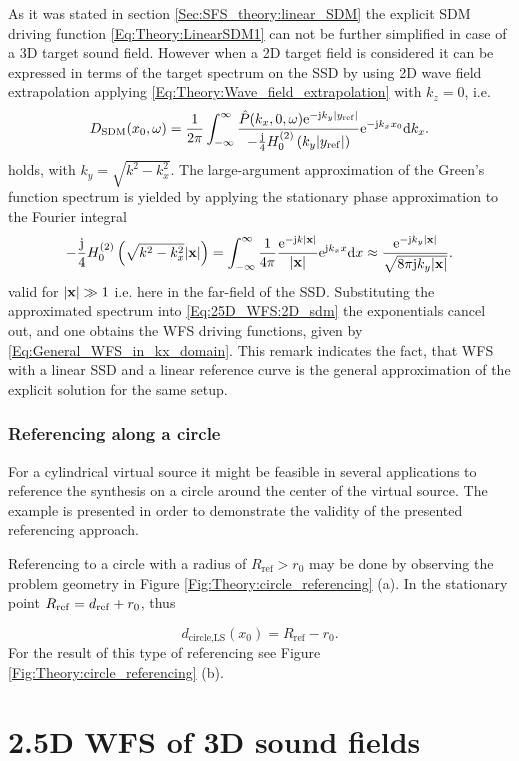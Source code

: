 \vspace{3mm}
As it was stated in section \ref{Sec:SFS_theory:linear_SDM} the explicit SDM driving function \eqref{Eq:Theory:LinearSDM1} can not be further simplified in case of a 3D target sound field. However when a 2D target field is considered it can be expressed in terms of the target spectrum on the SSD by using 2D wave field extrapolation applying \eqref{Eq:Theory:Wave_field_extrapolation} with $k_z = 0$, i.e.
%
 \begin{equation}
D_{\mathrm{SDM}}(x_0,\omega) = \frac{1}{2\pi} \int_{-\infty}^{\infty} \frac{ \hat{P}(k_x,0,\omega) \mathrm{e}^{-\mathrm{j} k_y |y_{\mathrm{ref}}|}}{
-\frac{\mathrm{j}}{4}H_0^{(2)}\left( k_y |y_{\mathrm{ref}}| \right) }
\mathrm{e}^{-\mathrm{j} k_x x_0 }
\mathrm{d} k_x.
\label{Eq:25D_WFS:2D_sdm}
\end{equation}
holds, with $k_y = \sqrt{k^2-k_x^2}$.
The large-argument approximation of the Green's function spectrum is yielded by applying the stationary phase approximation to the Fourier integral 
\begin{equation}
-\frac{\mathrm{j}}{4} H_0^{(2)} \left( \sqrt{k^2-k_x^2} |\mathbf{x}| \right)  = \int_{-\infty}^{\infty} \frac{1}{4\pi} \frac{\mathrm{e}^{-\mathrm{j} k|\mathbf{x}|}}{|\mathbf{x}|}
\mathrm{e}^{\mathrm{j} k_x x} \mathrm{d} x
\approx  
\frac{\mathrm{e}^{-\mathrm{j} k_y |\mathbf{x}|}}{\sqrt{8\pi\mathrm{j} k_y |\mathbf{x}|}}.
\end{equation}
valid for $|\mathbf{x}| \gg 1$ i.e. here in the far-field of the SSD. Substituting the approximated spectrum into \eqref{Eq:25D_WFS:2D_sdm} the exponentials cancel out, and one obtains the WFS driving functions, given by \eqref{Eq:General_WFS_in_kx_domain}. This remark indicates the fact, that WFS with a linear SSD and a linear reference curve is the general approximation of the explicit solution for the same setup.

\subsubsection{Referencing along a circle}
For a cylindrical virtual source it might be feasible in several applications to reference the synthesis on a circle around the center of the virtual source. The example is presented in order to demonstrate the validity of the presented referencing approach.

Referencing to a circle with a radius of $R_{\mathrm{ref}} > r_0$ may be done by observing the problem geometry in Figure \ref{Fig:Theory:circle_referencing} (a). 
In the stationary point $R_{\mathrm{ref}} = d_{\mathrm{ref}} + r_0$, thus

\begin{equation}
d_\text{circle,LS}(x_0) = R_{\mathrm{ref}} - r_0.
\label{Eq:dCircleLS}
\end{equation}
For the result of this type of referencing see Figure \ref{Fig:Theory:circle_referencing} (b).

\section{2.5D WFS of 3D sound fields}
%
